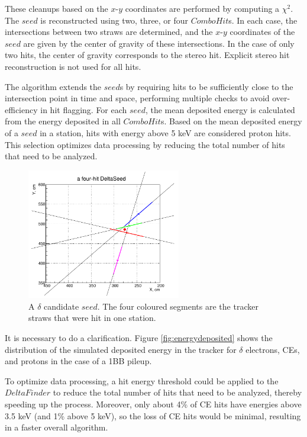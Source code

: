 These cleanups based on the $x$-$y$ coordinates are performed 
by computing a $\chi^2$. The $seed$ is reconstructed using 
two, three, or four $ComboHit$s. In each case, the 
intersections between two straws are determined, 
and the $x$-$y$ coordinates of the $seed$ are given 
by the center of gravity of these intersections. 
In the case of only two hits, the center of gravity 
corresponds to the stereo hit. Explicit stereo hit 
reconstruction is not used for all hits.

The algorithm extends the $seed$s by requiring 
hits to be sufficiently close to the intersection 
point in time and space, performing multiple checks 
to avoid over-efficiency in hit flagging. For each $seed$, 
the mean deposited energy is calculated from the energy 
deposited in all $ComboHit$s. Based on the mean 
deposited energy of a $seed$ in a station, hits with 
energy above 5 keV are considered proton hits. 
This selection optimizes data processing by 
reducing the total number of hits that need to be analyzed.

\begin{figure}[!h]
    \centering
    \includegraphics[width =0.6\textwidth]{figures/png/Screenshot_20240811_115854.png}
    \caption[A $\delta$ candidate $seed$.]{A $\delta$ candidate $seed$. The four coloured segments are the tracker straws that were
    hit in one station.}
    \label{fig:deltaseeds}
\end{figure}

It is necessary to do a clarification. 
Figure \ref{fig:energydeposited} shows the 
distribution of the simulated deposited energy 
in the tracker for $\delta$ electrons, CEs, and 
protons in the case of a 1BB pileup. 

To optimize data processing, a hit energy 
threshold could be applied to the $DeltaFinder$ 
to reduce the total number of hits that need to be analyzed, 
thereby speeding up the process. Moreover, only about 
4\% of CE hits have energies above 3.5 keV 
(and 1\% above 5 keV), so the loss of CE 
hits would be minimal, resulting in a faster overall algorithm. 


